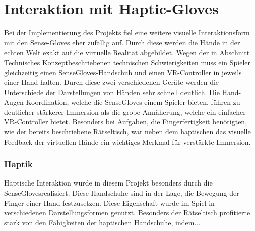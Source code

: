 \section{Interaktion mit Haptic-Gloves}
Bei der Implementierung des Projekts fiel eine weitere visuelle Interaktionsform mit den Sense-Gloves eher zufällig auf. Durch diese werden die Hände in der echten Welt exakt auf die virtuelle Realität abgebildet. Wegen der in Abschnitt \dq Technisches Konzept\dq beschriebenen technischen Schwierigkeiten muss ein Spieler gleichzeitig einen SenseGloves-Handschuh und einen VR-Controller in jeweils einer Hand halten. Durch diese zwei verschiedenen Geräte werden die Unterschiede der Darstellungen von Händen sehr schnell deutlich. Die Hand-Augen-Koordination, welche die SenseGloves einem Spieler bieten, führen zu deutlicher stärkerer Immersion als die grobe Annäherung, welche ein einfacher VR-Controller bietet. Besonders bei Aufgaben, die Fingerfertigkeit benötigten, wie der bereits beschriebene Rätseltisch, war neben dem haptischen das visuelle Feedback der virtuellen Hände ein wichtiges Merkmal für verstärkte Immersion.
\subsubsection{Haptik}
Haptische Interaktion wurde in diesem Projekt besonders durch die \dq SenseGloves\dq realisiert. Diese Handschuhe sind in der Lage, die Bewegung der Finger einer Hand festzusetzen. Diese Eigenschaft wurde im Spiel in verschiedenen Darstellungsformen genutzt. Besonders der Rätseltisch profitierte stark von den Fähigkeiten der haptischen Handschuhe, indem...

